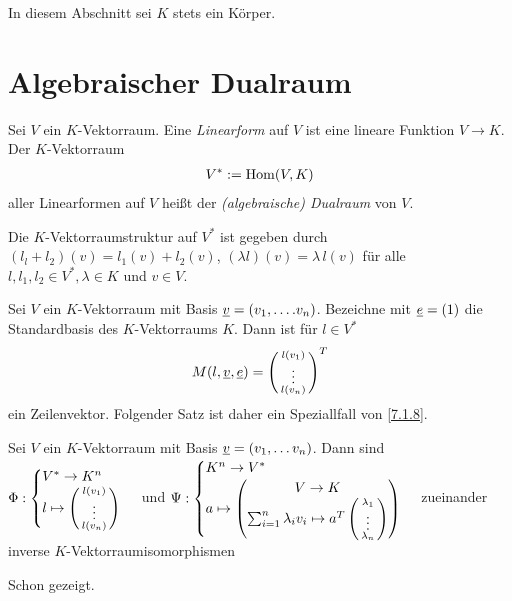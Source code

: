 \documentclass[../../main.tex]{subfiles}
\begin{document}
In diesem Abschnitt sei $K$ stets ein Körper.

\section{Algebraischer Dualraum}

\begin{df}\label{13.1.1} 
	Sei $V$ ein $K$-Vektorraum. Eine \emph{Linearform} auf $V$ ist eine lineare Funktion $V\to K$. Der $K$-Vektorraum
	\begin{align*}
		V^*:=\operatorname{Hom}(V,K)
	\end{align*}
	aller Linearformen auf $V$ heißt der \emph{(algebraische) Dualraum} von $V$.
\end{df} 

\begin{er}\label{13.1.2}
	Die $K$-Vektorraumstruktur auf $V^*$ ist gegeben durch
	$(l_l+l_2)(v)=l_1(v)+l_2(v)$, $(\lambda l)(v)=\lambda\,l(v)$ für alle $l,l_1,l_2\in V^*, \lambda\in K$ und $v\in V$.
\end{er}

\begin{bem}\label{13.1.3}
	Sei $V$ ein $K$-Vektorraum mit Basis ${\underline v}=(v_1,\ldots .v_n)$. Bezeichne mit ${\underline e}=(1)$ die Standardbasis des $K$-Vektorraums $K$.  Dann ist für $l\in V^*$
	\begin{align*}
		M(l,\underline{v},\underline{e})=\left(\begin{smallmatrix}l(v_1)\\\vdots\\l(v_n)\end{smallmatrix}\right)^T
	\end{align*}
	ein Zeilenvektor. Folgender Satz ist daher ein Speziallfall von \ref{7.1.8}.
\end{bem}

\begin{sat}\label{13.1.4}
	Sei $V$ ein $K$-Vektorraum mit Basis ${\underline v}=(v_1,\ldots v_n)$. Dann sind $\Phi: \begin{cases}V^*\to K^n\\l\mapsto \left(\begin{smallmatrix}l(v_1)\\\vdots\\l(v_n)\end{smallmatrix}\right)\end{cases}$ und $\Psi: \begin{cases}K^n\to V^*\\ a\mapsto\begin{pmatrix*}V\to K\\\sum_{i=1}^n\lambda_iv_i\mapsto a^T\cvec{\lambda_1\\\vdots\\\lambda_n}\end{pmatrix*}\end{cases}$ zueinander inverse $K$-Vektorraumisomorphismen
\end{sat}
\begin{cproof} 
	Schon gezeigt.
\end{cproof}
	
\end{document}
